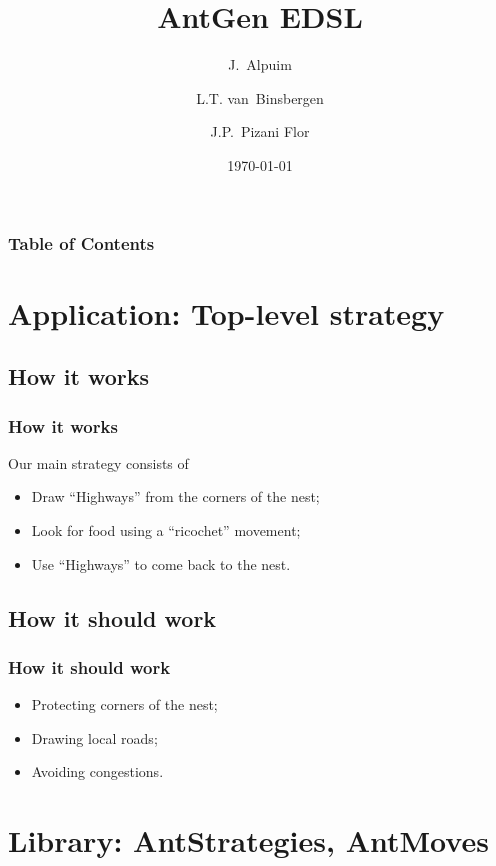 \documentclass{beamer}
\title[Ants]{AntGen EDSL}
\date{\today}
\author[Alpuim, Binsbergen, Pizani Flor]
{
    J.~Alpuim
    \and L.T. van~Binsbergen
    \and J.P.~Pizani Flor
}
\institute[Utrecht University]
{
    Department of Information and Computing Sciences,
    Utrecht University
}
\begin{document}
    \begin{frame}
        \titlepage
    \end{frame}

    \begin{frame}
        \frametitle{Table of Contents}
        \tableofcontents
    \end{frame}

    \section{Application: Top-level strategy}

    \subsection{How it works}
    \begin{frame}
    \frametitle{How it works}

	   Our main strategy consists of
	   \begin{itemize}
	   \item Draw ``Highways'' from the corners of the nest;  
	   \item Look for food using a ``ricochet'' movement;
	   \item Use ``Highways'' to come back to the nest.
	   \end{itemize} 

    \end{frame}
    
    \subsection{How it should work}
    \begin{frame}
    \frametitle{How it should work}

	    \begin{itemize}
	    \item Protecting corners of the nest; 
	    \item Drawing local roads;
	    \item Avoiding congestions.
	    \end{itemize}

    \end{frame}
    

    \section{Library: AntStrategies, AntMoves}
   
\end{document}
